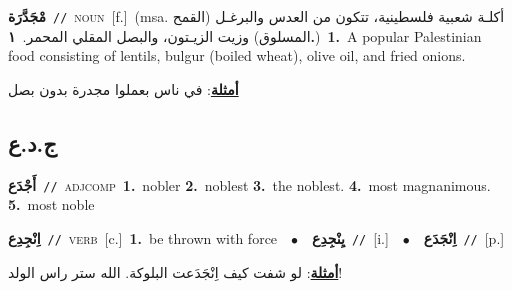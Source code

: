 \documentclass[10pt,a4paper,twoside]{article} %
\begin{document}
\begin{multicols}{2}
{{{{{{{{{{{{{\setlength\topsep{0pt}\textbf{\foreignlanguage{arabic}{مْجَدَّرَة}}\ {\color{gray}\texttt{//}\color{black}}\ \textsc{noun}\ [f.]\ \color{gray}(msa. \foreignlanguage{arabic}{أكلـة شعبية فلسطينية، تتكون من العدس والبرغـل (القمح المسلوق) وزيت الزيـتون، والبصل المقلي المحمر.}~\foreignlanguage{arabic}{\textbf{١.}})\color{black}\ \textbf{1.}~A popular Palestinian food consisting of lentils, bulgur (boiled wheat), olive oil, and fried onions.\  \begin{flushright}\color{gray}\foreignlanguage{arabic}{\textbf{\underline{\foreignlanguage{arabic}{أمثلة}}}: في ناس بعملوا مجدرة بدون بصل}\end{flushright}\color{black}} \vspace{2mm}

\vspace{-3mm}
\subsection*{\color{blue}\foreignlanguage{arabic}{ج.د.ع}\color{blue}{}} 

{\setlength\topsep{0pt}\textbf{\foreignlanguage{arabic}{أَجْدَع}}\ {\color{gray}\texttt{//}\color{black}}\ \textsc{adj\textunderscore comp}\ \textbf{1.}~nobler  \textbf{2.}~noblest  \textbf{3.}~the noblest.  \textbf{4.}~most magnanimous.  \textbf{5.}~most noble\ 

{\setlength\topsep{0pt}\textbf{\foreignlanguage{arabic}{اِنْجِدِع}}\ {\color{gray}\texttt{//}\color{black}}\ \textsc{verb}\ [c.]\ \textbf{1.}~be thrown with force\ \ $\bullet$\ \ \setlength\topsep{0pt}\textbf{\foreignlanguage{arabic}{يِنْجِدِع}}\ {\color{gray}\texttt{//}\color{black}}\ [i.]\ \ $\bullet$\ \ \setlength\topsep{0pt}\textbf{\foreignlanguage{arabic}{اِنْجَدَع}}\ {\color{gray}\texttt{//}\color{black}}\ [p.]\  \begin{flushright}\color{gray}\foreignlanguage{arabic}{\textbf{\underline{\foreignlanguage{arabic}{أمثلة}}}: لو شفت كيف اِنْجَدَعت البلوكة. الله ستر راس الولد!}\end{flushright}\color{black}} \vspace{2mm}

}}}}}}}}}}}}}
\end{multicols}
\end{document}

